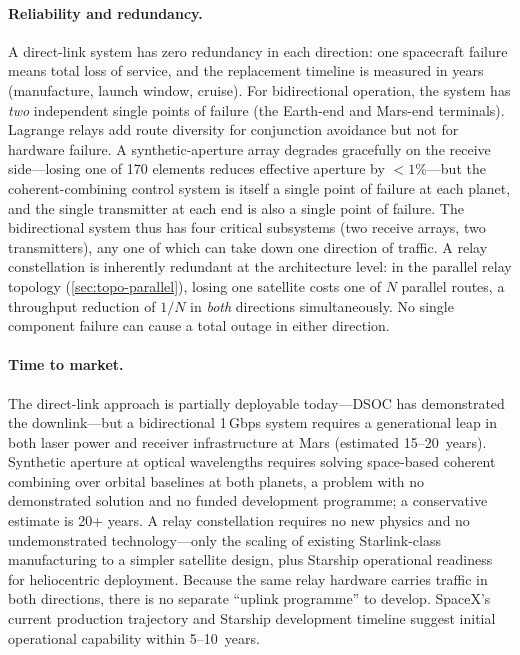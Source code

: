 \paragraph{Reliability and redundancy.}
A direct-link system has zero redundancy in each direction: one spacecraft failure
means total loss of service, and the replacement timeline is measured in years
(manufacture, launch window, cruise). For bidirectional operation, the system has
\emph{two} independent single points of failure (the Earth-end and Mars-end
terminals). Lagrange relays add route diversity for conjunction avoidance but not
for hardware failure. A synthetic-aperture array degrades gracefully on the
receive side---losing one of 170 elements reduces effective aperture by
$< 1\%$---but the coherent-combining control system is itself a single point of
failure at each planet, and the single transmitter at each end is also a single
point of failure. The bidirectional system thus has four critical subsystems
(two receive arrays, two transmitters), any one of which can take down one
direction of traffic.
A relay constellation is inherently redundant at the architecture level: in the
parallel relay topology (\cref{sec:topo-parallel}), losing one satellite costs one of
$N$ parallel routes, a throughput reduction of $1/N$ in \emph{both} directions
simultaneously. No single component failure can cause a total outage in either
direction.

\paragraph{Time to market.}
The direct-link approach is partially deployable today---DSOC has demonstrated
the downlink---but a bidirectional 1\,Gbps system requires a generational leap
in both laser power and receiver infrastructure at Mars (estimated 15--20~years).
Synthetic aperture at optical wavelengths requires solving space-based coherent
combining over orbital baselines at both planets, a problem with no demonstrated
solution and no funded development programme; a conservative estimate is 20+
years. A relay constellation requires no new physics and no undemonstrated
technology---only the scaling of existing Starlink-class manufacturing to a
simpler satellite design, plus Starship operational readiness for heliocentric
deployment. Because the same relay hardware carries traffic in both directions,
there is no separate ``uplink programme'' to develop. SpaceX's current production
trajectory and Starship development timeline suggest initial operational
capability within 5--10~years.

